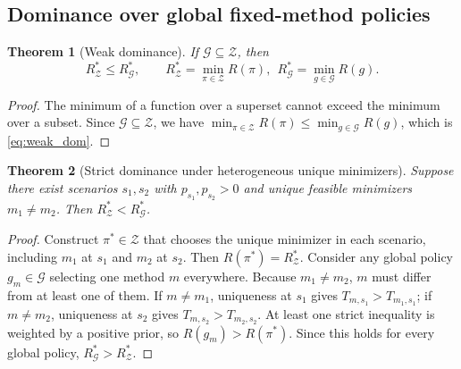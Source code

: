 \documentclass{article} %
\newtheorem{theorem}{Theorem}[section]
\begin{document}
\subsection{Dominance over global fixed-method policies}
\begin{theorem}[Weak dominance]
\label{thm:weak_dominance}
If $\mathcal{G}\subseteq\mathcal{Z}$, then
\begin{equation}
R_{\mathcal{Z}}^*\le R_{\mathcal{G}}^*,\qquad
R_{\mathcal{Z}}^*=\min_{\pi\in\mathcal{Z}}R(\pi),\ \ R_{\mathcal{G}}^*=\min_{g\in\mathcal{G}}R(g).
\label{eq:weak_dom}
\end{equation}
\end{theorem}
\begin{proof}
The minimum of a function over a superset cannot exceed the minimum over a subset. Since $\mathcal{G}\subseteq\mathcal{Z}$, we have $\min_{\pi\in\mathcal{Z}}R(\pi)\le\min_{g\in\mathcal{G}}R(g)$, which is \eqref{eq:weak_dom}.
\end{proof}

\begin{theorem}[Strict dominance under heterogeneous unique minimizers]
\label{thm:strict_dominance}
Suppose there exist scenarios $s_1,s_2$ with $p_{s_1},p_{s_2}>0$ and unique feasible minimizers $m_1\neq m_2$. Then $R_{\mathcal{Z}}^*<R_{\mathcal{G}}^*$.
\end{theorem}
\begin{proof}
Construct $\pi^*\in\mathcal{Z}$ that chooses the unique minimizer in each scenario, including $m_1$ at $s_1$ and $m_2$ at $s_2$. Then $R(\pi^*)=R_{\mathcal{Z}}^*$. Consider any global policy $g_m\in\mathcal{G}$ selecting one method $m$ everywhere. Because $m_1\neq m_2$, $m$ must differ from at least one of them. If $m\neq m_1$, uniqueness at $s_1$ gives $T_{m,s_1}>T_{m_1,s_1}$; if $m\neq m_2$, uniqueness at $s_2$ gives $T_{m,s_2}>T_{m_2,s_2}$. At least one strict inequality is weighted by a positive prior, so $R(g_m)>R(\pi^*)$. Since this holds for every global policy, $R_{\mathcal{G}}^*>R_{\mathcal{Z}}^*$.
\end{proof}
\end{document}
